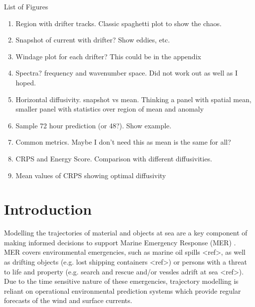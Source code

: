 \documentclass[preprints,article,submit,pdftex,moreauthors]{Definitions/mdpi}
\begin{document}
List of Figures
\begin{enumerate}
	\item Region with drifter tracks. Classic spaghetti plot to show the chaos.
	\item Snapshot of current with drifter? Show eddies, etc.
	\item Windage plot for each drifter? This could be in the appendix
	\item Spectra? frequency and wavenumber space. Did not work out as well as I hoped.
	\item Horizontal diffusivity. snapshot vs mean. Thinking a panel with spatial mean, smaller panel with statistics over region of mean and anomaly
	\item Sample 72 hour prediction (or 48?). Show example.
	\item Common metrics. Maybe I don't need this as mean is the same for all?
	\item CRPS and Energy Score. Comparison with different diffusivities. 
	\item Mean values of CRPS showing optimal diffusivity
\end{enumerate}

\section{Introduction}

Modelling the trajectories of material and objects at sea are a key component of making informed decisions to support Marine Emergency Response (MER) \cite{MER_guide}. MER covers environmental emergencies, such as marine oil spills <ref>, as well as drifting objects (e.g. lost shipping containers <ref>) or persons with a threat to life and property (e.g. search and rescue and/or vessles adrift at sea <ref>). Due to the time sensitive nature of these emergencies, trajectory modelling is reliant on operational environmental prediction systems which provide regular forecasts of the wind and surface currents.
\end{document}
